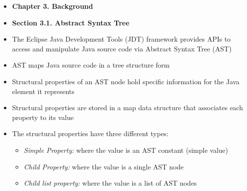 \documentclass{article}
\newcommand{\bold}{\textbf}
\newcommand{\itt}{\textit}
\begin{document}
\begin{itemize} [leftmargin=.1in]
\item \bold{Chapter 3. Background}
\item \bold{Section 3.1. Abstract Syntax Tree}
\item The Eclipse Java Development Tools (JDT) framework provides APIs to access and manipulate Java source code via Abstract Syntax Tree (AST)
\item AST maps Java source code in a tree structure form
\item Structural properties of an AST node hold specific information for the Java element it represents
\item Structural properties are stored in a map data structure that associates each property to its value
\item The structural properties have three different types:
\begin{itemize} [leftmargin=.1in]
\item \itt{Simple Property:} where the value is an AST constant (simple value)
\item \itt{Child Property:} where the value is a single AST node
\item \itt{Child list property:} where the value is a list of AST nodes
\end{itemize}


\end{itemize}
\end{document}
